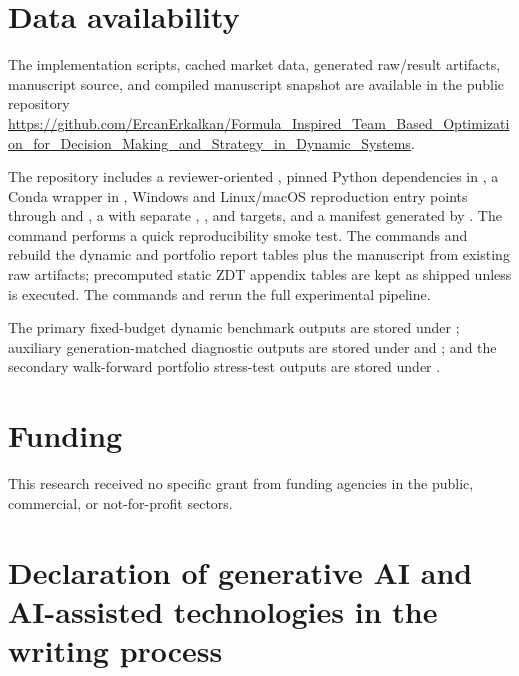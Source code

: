 \documentclass[preprint,12pt]{elsarticle}
\begin{document}
\section*{Data availability}

The implementation scripts, cached market data, generated raw/result artifacts, manuscript source, and compiled manuscript snapshot are available in the public repository \url{https://github.com/ErcanErkalkan/Formula_Inspired_Team_Based_Optimization_for_Decision_Making_and_Strategy_in_Dynamic_Systems}.

The repository includes a reviewer-oriented , pinned Python dependencies in , a Conda wrapper in , Windows and Linux/macOS reproduction entry points through  and , a  with separate , , and  targets, and a  manifest generated by . The command  performs a quick reproducibility smoke test. The commands  and  rebuild the dynamic and portfolio report tables plus the manuscript from existing raw artifacts; precomputed static ZDT appendix tables are kept as shipped unless  is executed. The commands  and  rerun the full experimental pipeline.

The primary fixed-budget dynamic benchmark outputs are stored under ; auxiliary generation-matched diagnostic outputs are stored under  and ; and the secondary walk-forward portfolio stress-test outputs are stored under .

\section*{Funding}

This research received no specific grant from funding agencies in the public, commercial, or not-for-profit sectors.

\section*{Declaration of generative AI and AI-assisted technologies in the writing process}
\end{document}
